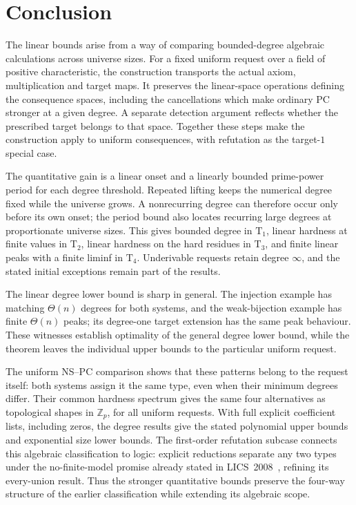 \documentclass[11pt,a4paper]{article}
\theoremstyle{definition}\newtheorem{definition}[theorem]{Definition}
\theoremstyle{remark}\newtheorem{remark}[theorem]{Remark}
\begin{document}
\section{Conclusion}\label{sec:conclusion}
The linear bounds arise from a way of comparing bounded-degree algebraic
calculations across universe sizes. For a fixed uniform request over a
field of positive characteristic, the construction transports the actual
axiom, multiplication and target maps. It preserves the linear-space
operations defining the consequence spaces, including the cancellations
which make ordinary PC stronger at a given degree. A separate detection
argument reflects whether the prescribed target belongs to that space.
Together these steps make the construction apply to uniform consequences,
with refutation as the target-$1$ special case.

The quantitative gain is a linear onset and a linearly bounded prime-power
period for each degree threshold. Repeated lifting keeps the numerical
degree fixed while the universe grows. A nonrecurring degree can therefore
occur only before its own onset; the period bound also locates recurring
large degrees at proportionate universe sizes. This gives bounded degree
in $\mathrm T_1$, linear hardness at finite values in $\mathrm T_2$, linear
hardness on the hard residues in $\mathrm T_3$, and finite linear peaks
with a finite liminf in $\mathrm T_4$. Underivable requests retain degree
$\infty$, and the stated initial exceptions remain part of the results.

The linear degree lower bound is sharp in general. The injection example has matching
$\Theta(n)$ degrees for both systems, and the weak-bijection example has
finite $\Theta(n)$ peaks; its degree-one target extension has the same
peak behaviour. These witnesses establish optimality of the general
degree lower bound, while the theorem leaves the individual upper bounds to the
particular uniform request.

The uniform NS--PC comparison shows that these patterns belong to the
request itself: both systems assign it the same type, even when their
minimum degrees differ. Their common hardness spectrum gives the same
four alternatives as topological shapes in $\mathbb Z_p$, for all
uniform requests. With full explicit coefficient lists, including
zeros, the degree results give the stated polynomial upper bounds and
exponential size lower bounds. The first-order refutation subcase connects
this algebraic classification to logic: explicit reductions separate
any two types under the no-finite-model promise already stated in
LICS~2008~\cite[Theorem~1]{Riis}, refining its every-union result.
Thus the stronger quantitative bounds preserve the four-way
structure of the earlier classification while extending its algebraic
scope.
\end{document}
